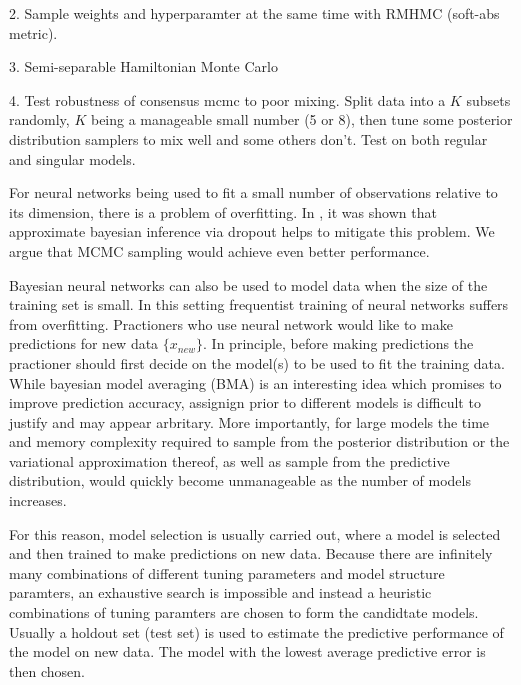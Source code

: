 \documentclass{book}
\begin{document}
\begin{enumerate}
2. Sample weights and hyperparamter at the same time with RMHMC (soft-abs metric).

3. Semi-separable Hamiltonian Monte Carlo

4.   
Test robustness of consensus mcmc to poor mixing. Split data into a $K$ subsets randomly, $K$ being a manageable small number (5 or 8), then tune some posterior distribution samplers to mix well and some others don't. Test on both regular and singular models.
 
For neural networks being used to fit a small number of observations relative to its dimension, there is a problem of overfitting. In \cite{gal2015bayesian}, it was shown that approximate bayesian inference via dropout helps to mitigate this problem. We argue that MCMC sampling would achieve even better performance.


Bayesian neural networks can also be used to model data when the size of the training set is small. In this setting frequentist training of neural networks suffers from overfitting. Practioners who use neural network would like to make predictions for new data $\{x_{new}\}$. In principle, before making predictions the practioner should first decide on the model(s) to be used to fit the training data. While bayesian model averaging (BMA) is an interesting idea which promises to improve prediction accuracy, assignign prior to different models is difficult to justify and may appear arbritary. More importantly, for large models the time and memory complexity required to sample from the posterior distribution or the variational approximation thereof, as well as sample from the predictive distribution, would quickly become unmanageable as the number of models increases. 

For this reason, model selection is usually carried out, where a model is selected and then trained to make predictions on new data. Because there are infinitely many combinations of different tuning parameters and model structure paramters, an exhaustive search is impossible and instead a heuristic combinations of tuning paramters are chosen to form the candidtate models. Usually a holdout set (test set) is used to estimate the predictive performance of the model on new data. The model with the lowest average predictive error is then chosen. 


\end{enumerate}
\end{document}
